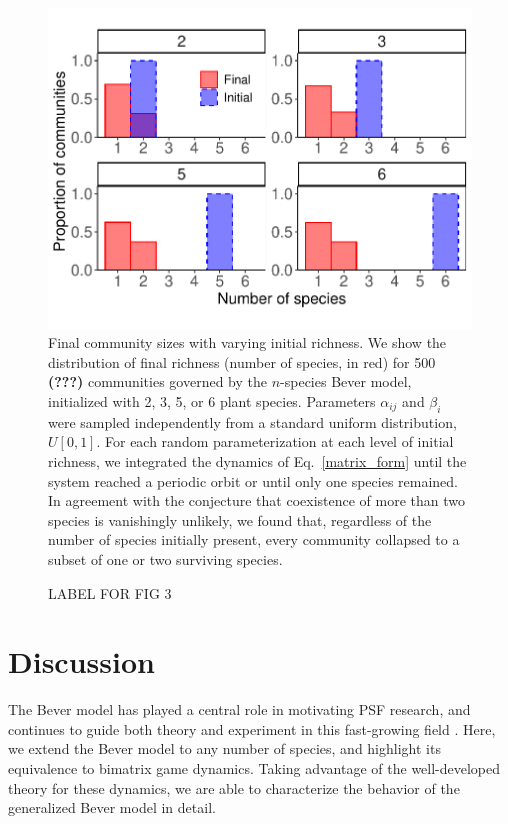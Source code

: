 \documentclass[11pt]{article}
\begin{document}
\begin{figure}
	\centering
	\includegraphics[width=\textwidth]{figure_2.pdf}
	\caption[Final community sizes with varying initial richness]
	{Final community sizes with varying initial richness. We show the distribution of final richness (number of species, in red) for 500 \textbf{(???)} communities governed by the $n$-species Bever model, initialized with 2, 3, 5, or 6 plant species. Parameters $\alpha_{ij}$ and $\beta_{i}$  were sampled independently from a standard uniform distribution, $U[0,1]$. For each random parameterization at each level of initial richness, we integrated the dynamics of Eq.~\ref{matrix_form} until the system reached a periodic orbit or until only one species remained. In agreement with the conjecture that coexistence of more than two species is vanishingly unlikely, we found that, regardless of the number of species initially present, every community collapsed to a subset of one or two surviving species.}
	\label{fig:histograms}
\end{figure}


\begin{figure}
	\centering
	\caption[HERE GOES FIGURE 3]
	{LABEL FOR FIG 3}
	\label{fig:fragile}
\end{figure}


\section{Discussion}

The Bever model has played a central role in motivating PSF research, and continues to guide both theory and experiment in this fast-growing field \citep{bever2015maintenance, kandlikar2019winning, ke2020effects}. Here, we extend the Bever model to any number of species, and highlight its equivalence to bimatrix game dynamics. Taking advantage of the well-developed theory for these dynamics, we are able to characterize the behavior of the generalized Bever model in detail.
\end{document}
